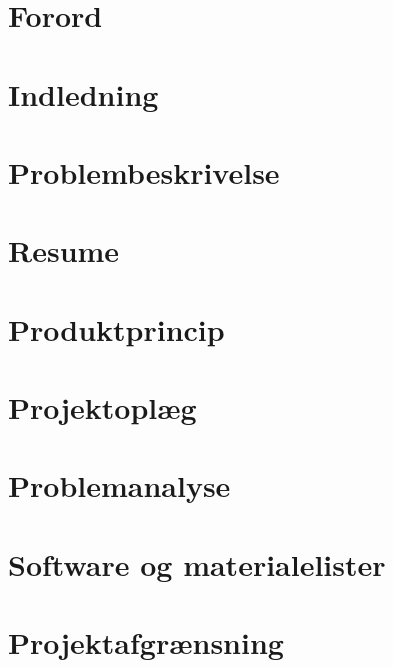 \documentclass[a4paper, 12pt]{article}
\begin{document}

 \restoregeometry
\newpage
{}

\section*{Forord}

\newpage

\tableofcontents

\section{Indledning}

\newpage

\section{Problembeskrivelse}


\section{Resume}

\newpage

\section{Produktprincip}

\newpage

\section{Projektoplæg}\label{sec:projektoplæg}
\begin{minipage}{\textwidth}
  
\end{minipage}
\newpage

\section{Problemanalyse}\label{sec:problemanalyse}

\newpage

\section{Software og materialelister}

\newpage

\section{Projektafgrænsning}

\newpage
\end{document}
